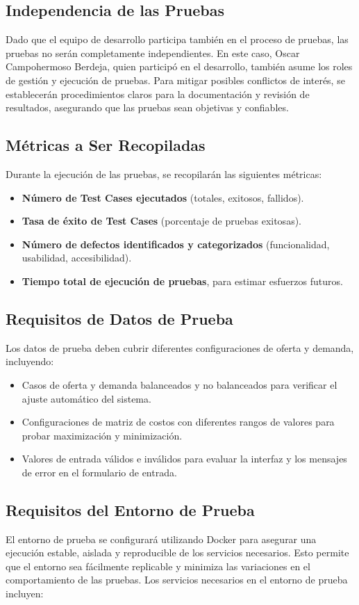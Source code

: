 \documentclass[stu, 12pt, letterpaper, donotrepeattitle, floatsintext, natbib]{apa7}
\begin{document}
\subsection{Independencia de las Pruebas}
Dado que el equipo de desarrollo participa también en el proceso de pruebas, las pruebas no serán completamente independientes. En este caso, Oscar Campohermoso Berdeja, quien participó en el desarrollo, también asume los roles de gestión y ejecución de pruebas. Para mitigar posibles conflictos de interés, se establecerán procedimientos claros para la documentación y revisión de resultados, asegurando que las pruebas sean objetivas y confiables.

\subsection{Métricas a Ser Recopiladas}
Durante la ejecución de las pruebas, se recopilarán las siguientes métricas:
\begin{itemize}
    \item \textbf{Número de Test Cases ejecutados} (totales, exitosos, fallidos).
    \item \textbf{Tasa de éxito de Test Cases} (porcentaje de pruebas exitosas).
    \item \textbf{Número de defectos identificados y categorizados} (funcionalidad, usabilidad, accesibilidad).
    \item \textbf{Tiempo total de ejecución de pruebas}, para estimar esfuerzos futuros.
\end{itemize}

\subsection{Requisitos de Datos de Prueba}
Los datos de prueba deben cubrir diferentes configuraciones de oferta y demanda, incluyendo:
\begin{itemize}
    \item Casos de oferta y demanda balanceados y no balanceados para verificar el ajuste automático del sistema.
    \item Configuraciones de matriz de costos con diferentes rangos de valores para probar maximización y minimización.
    \item Valores de entrada válidos e inválidos para evaluar la interfaz y los mensajes de error en el formulario de entrada.
\end{itemize}

\subsection{Requisitos del Entorno de Prueba}
El entorno de prueba se configurará utilizando Docker para asegurar una ejecución estable, aislada y reproducible de los servicios necesarios. Esto permite que el entorno sea fácilmente replicable y minimiza las variaciones en el comportamiento de las pruebas. Los servicios necesarios en el entorno de prueba incluyen:
\end{document}
